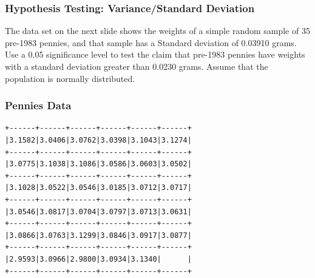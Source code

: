 \documentclass[xcolor=dvipsnames]{beamer}
\begin{document}



\begin{frame}
  \frametitle{Hypothesis Testing: Variance/Standard Deviation}
  {\ubung} The data set on the next slide shows the weights of a
  simple random sample of 35 pre-1983 pennies, and that sample has
  a Standard deviation of 0.03910 grams. Use a 0.05 significance
  level to test the claim that pre-1983 pennies have weights with
  a standard deviation greater than 0.0230 grams. Assume that the
  population is normally distributed.
\end{frame}

\begin{frame}[fragile]
  \frametitle{Pennies Data}
\begin{verbatim}
+------+------+------+------+------+------+
|3.1582|3.0406|3.0762|3.0398|3.1043|3.1274|
+------+------+------+------+------+------+
|3.0775|3.1038|3.1086|3.0586|3.0603|3.0502|
+------+------+------+------+------+------+
|3.1028|3.0522|3.0546|3.0185|3.0712|3.0717|
+------+------+------+------+------+------+
|3.0546|3.0817|3.0704|3.0797|3.0713|3.0631|
+------+------+------+------+------+------+
|3.0866|3.0763|3.1299|3.0846|3.0917|3.0877|
+------+------+------+------+------+------+
|2.9593|3.0966|2.9800|3.0934|3.1340|      |
+------+------+------+------+------+------+
\end{verbatim}
\end{frame}
\end{document}
